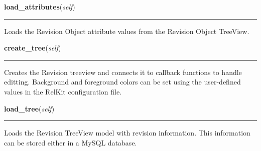     \vspace{0.5ex}

\hspace{.8\funcindent}\begin{boxedminipage}{\funcwidth}

    \raggedright \textbf{load\_attributes}(\textit{self})

    \vspace{-1.5ex}

    \rule{\textwidth}{0.5\fboxrule}
\setlength{\parskip}{2ex}
    Loads the Revision Object attribute values from the Revision Object 
    TreeView.

\setlength{\parskip}{1ex}
    \end{boxedminipage}

    \label{reliafree:revision:Revision:create_tree}

    \vspace{0.5ex}

\hspace{.8\funcindent}\begin{boxedminipage}{\funcwidth}

    \raggedright \textbf{create\_tree}(\textit{self})

    \vspace{-1.5ex}

    \rule{\textwidth}{0.5\fboxrule}
\setlength{\parskip}{2ex}
    Creates the Revision treeview and connects it to callback functions to 
    handle editting.  Background and foreground colors can be set using the
    user-defined values in the RelKit configuration file.

\setlength{\parskip}{1ex}
    \end{boxedminipage}

    \label{reliafree:revision:Revision:load_tree}

    \vspace{0.5ex}

\hspace{.8\funcindent}\begin{boxedminipage}{\funcwidth}

    \raggedright \textbf{load\_tree}(\textit{self})

    \vspace{-1.5ex}

    \rule{\textwidth}{0.5\fboxrule}
\setlength{\parskip}{2ex}
    Loads the Revision TreeView model with revision information. This 
    information can be stored either in a MySQL database.

\setlength{\parskip}{1ex}
    \end{boxedminipage}

